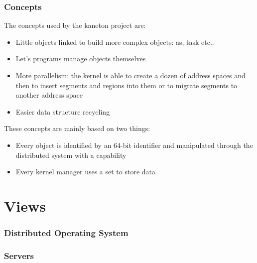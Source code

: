 \documentclass[8pt]{beamer}
\begin{document}

\begin{frame}
  \frametitle{Concepts}

  The concepts used by the kaneton project are:

  \begin{itemize}
    \item
      Little objects linked to build more complex objects:
      as, task etc..
    \item
      Let's programs manage objects themselves
    \item
      More parallelism: the kernel is able to create a dozen
      of address spaces and then to insert segments and regions
      into them or to migrate segments to another address space
    \item
      Easier data structure recycling
  \end{itemize}

  These concepts are mainly based on two things:

  \begin{itemize}
    \item
      Every object is identified by an 64-bit identifier and manipulated
      through the distributed system with a capability
    \item
      Every kernel manager uses a set to store data
  \end{itemize}
\end{frame}

%
%

\section{Views}


\begin{frame}
  \frametitle{Distributed Operating System}

  \begin{center}
  \end{center}
\end{frame}


\begin{frame}
  \frametitle{Servers}

  \begin{center}
  \end{center}
\end{frame}
\end{document}
